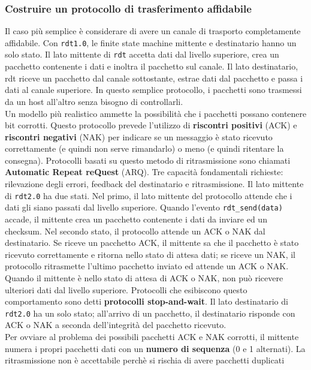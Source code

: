 \documentclass[11pt]{article}
\begin{document}
\subsubsection{Costruire un protocollo di trasferimento affidabile}
Il caso più semplice è considerare di avere un canale di trasporto completamente affidabile. Con \texttt{rdt1.0}, 
le finite state machine mittente e destinatario hanno un solo stato. Il lato mittente di \texttt{rdt} accetta dati dal 
livello superiore, crea un pacchetto contenente i dati e inoltra il pacchetto sul canale. Il
lato destinatario, rdt riceve un pacchetto dal canale sottostante, estrae dati
dal pacchetto e passa i dati al canale superiore. In questo semplice 
protocollo, i pacchetti sono trasmessi da un host all'altro senza bisogno di controllarli.\\
Un modello più realistico ammette la possibilità che i pacchetti possano contenere bit corrotti. Questo protocollo prevede
l'utilizzo di \textbf{riscontri positivi} (ACK) e \textbf{riscontri negativi} (NAK) per indicare se un messaggio è stato
ricevuto correttamente (e quindi non serve rimandarlo) o meno (e quindi ritentare la consegna). Protocolli basati su 
questo metodo di ritrasmissione sono chiamati \textbf{Automatic Repeat reQuest} (ARQ). Tre capacità fondamentali richieste:
rilevazione degli errori, feedback del destinatario e ritrasmissione.
Il lato mittente di \texttt{rdt2.0} ha due stati. Nel primo, il lato mittente del protocollo attende che i dati gli siano
passati dal livello superiore. Quando l'evento \texttt{rdt\_send(data)} accade, il mittente crea un pacchetto contenente
i dati da inviare ed un checksum. Nel secondo stato, il protocollo attende un ACK o NAK dal destinatario. Se riceve un 
pacchetto ACK, il mittente sa che il pacchetto è stato ricevuto correttamente e ritorna nello stato di attesa dati; se 
riceve un NAK, il protocollo ritrasmette l'ultimo pacchetto inviato ed attende un ACK o NAK. Quando il mittente è nello 
stato di attesa di ACK o NAK, non può ricevere ulteriori dati dal livello superiore. Protocolli che esibiscono questo
comportamento sono detti \textbf{protocolli stop-and-wait}.
Il lato destinatario di \texttt{rdt2.0} ha un solo stato; all'arrivo di un pacchetto, il destinatario risponde con ACK o 
NAK a seconda dell'integrità del pacchetto ricevuto.\\
Per ovviare al problema dei possibili pacchetti ACK e NAK corrotti, il mittente numera i propri pacchetti dati con un 
\textbf{numero di sequenza} (0 e 1 alternati). La ritrasmissione non è accettabile perchè si rischia di avere pacchetti duplicati
\end{document}
